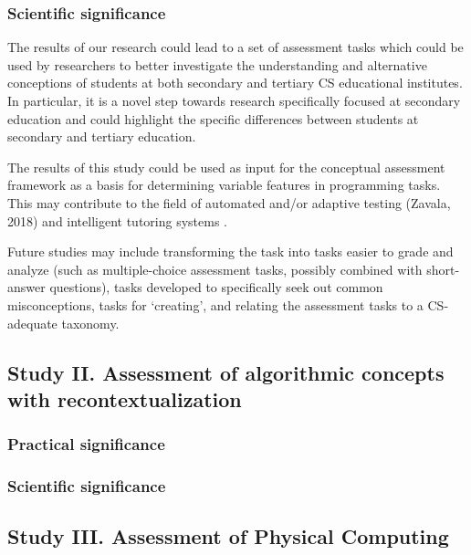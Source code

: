 

\subsubsection*{Scientific significance}
The results of our research could lead to a set of assessment tasks which could be used by researchers to better investigate the understanding and alternative conceptions of students at both secondary and tertiary CS educational institutes. In particular, it is a novel step towards research specifically focused at secondary education and could highlight the specific differences between students at secondary and tertiary education.

The results of this study could be used as input for the conceptual assessment framework as a basis for determining variable features in programming tasks. This may contribute to the field of automated and/or adaptive testing (Zavala, 2018) and intelligent tutoring systems \cite{LuxtonReilly2018}.


Future studies may include transforming the task into tasks easier to grade and analyze (such as multiple-choice assessment tasks, possibly combined with short-answer questions), tasks developed to specifically seek out common misconceptions, tasks for ‘creating’, and relating the assessment tasks to a CS-adequate taxonomy.


\subsection{Study II. Assessment of algorithmic concepts with recontextualization}
\subsubsection*{Practical significance}

\subsubsection*{Scientific significance}

\subsection{Study III. Assessment of Physical Computing}


